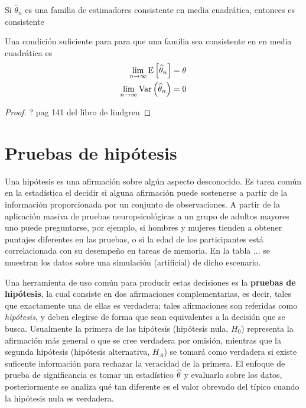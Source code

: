 \begin{teorema}
Si $\widehat{\theta}_n$ es una familia de estimadores consistente en media cuadrática, entonces es consistente
\end{teorema}

\begin{teorema}
Una condición suficiente para para que una familia sea consistente en en media cuadrática es
\begin{align}
\lim_{n\rightarrow\infty} \mathrm{E}\left[ \widehat{\theta}_n \right] &= \theta \\
\lim_{n\rightarrow\infty} \mathrm{Var}\left( \widehat{\theta}_n \right) &= 0
\end{align}
\end{teorema}

\begin{proof}
? pag 141 del libro de lindgren
\end{proof}




\section{Pruebas de hipótesis}


Una hipótesis es una afirmación sobre algún aspecto desconocido.
%
Es tarea común en la estadística el decidir si alguna afirmación puede sostenerse a partir de la
información proporcionada por un conjunto de observaciones. 
%
A partir de la aplicación masiva de pruebas neuropsicológicas a un grupo de adultos mayores uno 
puede preguntarse, por ejemplo, si hombres y mujeres tienden a obtener puntajes diferentes en las
pruebas, o si la edad de los participantes está correlacionada con su desempeño en tareas de 
memoria.
%
En la tabla ... se muestran los datos sobre una simulación (artificial) de dicho escenario.

Una herramienta de uso común para producir estas decisiones es la \textbf{pruebas de hipótesis},
la cual consiste en dos afirmaciones complementarias, es decir, tales que exactamente una de ellas es verdadera; tales afirmaciones
son referidas como \textit{hipótesis}, y deben elegirse de forma que sean equivalentes a la 
decisión que se busca. 
%
Usualmente la primera de las hipótesis (hipótesis nula, $H_0$) representa la afirmación más general o que se cree verdadera por omisión, mientras que la segunda hipótesis (hipótesis alternativa, $H_A$) se tomará como verdadera si
existe suficente información para rechazar la veracidad de la primera.
%
%
El enfoque de prueba de significancia es  tomar un estadístico $\widehat{ \theta }$ y evaluarlo sobre los datos, posteriormente se analiza qué tan diferente es el valor obrevado del típico cuando la hipótesis nula es verdadera.

